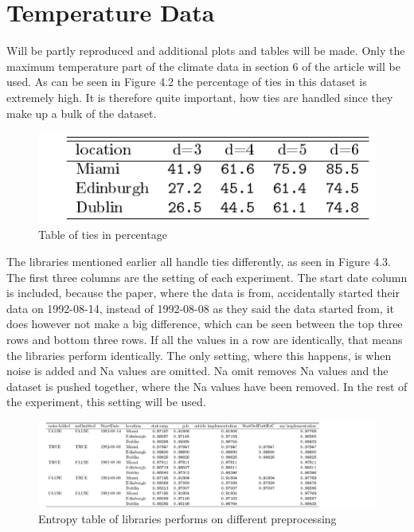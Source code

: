 \FloatBarrier

\section{Temperature Data}
\cite{Chagas2022} Will be partly reproduced and additional plots and tables will be made. Only the maximum temperature part of the climate data in section 6 of the article will be used. As can be seen in Figure 4.2 the percentage of ties in this dataset is extremely high. It is therefore quite important, how ties are handled since they make up a bulk of the dataset. 
\begin{figure}
    \centering
    \includegraphics{./Weather/tiesTable.pdf}
    \caption{Table of ties in percentage}
\end{figure}


The libraries mentioned earlier all handle ties differently, as seen in Figure 4.3. The first three columns are the setting of each experiment. The start date column is included, because the paper, where the data is from, accidentally started their data on 1992-08-14, instead of 1992-08-08 as they said the data started from, it does however not make a big difference, which can be seen between the top three rows and bottom three rows.  If all the values in a row are identically, that means the libraries perform identically. The only setting, where this happens, is when noise is added and Na values are omitted. Na omit removes Na values and the dataset is pushed together, where the Na values have been removed. In the rest of the experiment, this setting will be used. 

\begin{figure}
    \centering
    \includegraphics[width=\textwidth,keepaspectratio]{./Weather/entropyTable.pdf}
    \caption{Entropy table of libraries performs on different preprocessing}
\end{figure}

